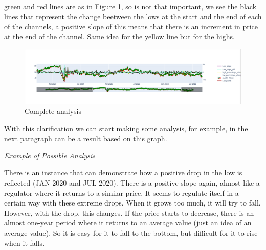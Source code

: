 \documentclass{article}
\begin{document}
green and red lines are as in Figure 1, so is not that important, we see the
black lines that represent the change beetween the lows at the start and the end
of each of the channels, a positive slope of this means that there is an
increment in price at the end of the channel. Same idea for the yellow line but
for the highs.
\begin{figure}[h]
  \caption{Complete analysis}
  \begin{center}
    \includegraphics[width=1\textwidth]{figures/2023-05-25-143658_1416x361_scrot.png}
  \end{center}
\end{figure}

With this clarification we can start making some analysis, for example, in the
next paragraph can be a result based on this graph.

\textit{Example of Possible  Analysis}

There is an instance that can demonstrate how a positive drop in the low is reflected (JAN-2020 and JUL-2020). There is a positive slope again, almost like a regulator where it returns to a similar price.
It seems to regulate itself in a certain way with these extreme drops. When it grows too much, it will try to fall. However, with the drop, this changes. If the price starts to decrease, there is an almost one-year period where it returns to an average value (just an idea of an average value). So it is easy for it to fall to the bottom, but difficult for it to rise when it falls.
\end{document}
